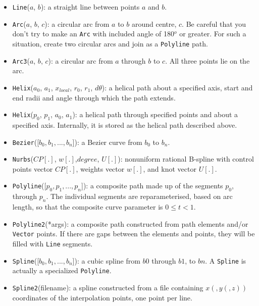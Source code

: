 \begin{itemize}
\item \texttt{Line}($a$, $b$): a straight line between points $a$ and $b$.
\item \texttt{Arc}($a$, $b$, $c$): a circular arc from $a$ to $b$ around centre,
  $c$.
  Be careful that you don't try to make an \texttt{Arc} with included angle of 180$^o$ or greater.
  For such a situation, create two circular arcs and join as a \texttt{Polyline} path.
\item \texttt{Arc3}($a$, $b$, $c$): a circular arc from $a$ through $b$ to $c$.
  All three points lie on the arc.
\item \texttt{Helix}($a_0$, $a_1$, $x_{local}$, $r_0$, $r_1$, $d\theta$): a helical path
  about a specified axis, start and end radii and angle through which the path extends.
\item \texttt{Helix}($p_0$, $p_1$, $a_0$, $a_1$): a helical path through specified points
  and about a specified axis.
  Internally, it is stored as the helical path described above.
\item \texttt{Bezier}([$b_0, b_1, ..., b_n$]): a Bezier curve from $b_0$ to
  $b_n$.
\item \texttt{Nurbs}($CP[.]$, $w[.]$,$degree$, $U[.]$): nonuniform rational B-spline with
  control points vector $CP[.]$, weights vector $w[.]$, and knot vector $U[.]$.
\item \texttt{Polyline}([$p_0, p_1, ..., p_n$]): a composite path made up of 
  the segments $p_0$, through $p_n$.
  The individual segments are reparameterised, based on arc length, so that
  the composite curve parameter is $0 \le t < 1$.
\item \texttt{Polyline2}(*args): a composite path constructed from path elements and/or \texttt{Vector} points.
  If there are gaps between the elements and points, 
  they will be filled with \texttt{Line} segments.
\item \texttt{Spline}([$b_0, b_1, ..., b_n$]): a cubic spline from $b0$ through
  $b1$, to $bn$.
  A \texttt{Spline} is actually a specialized \texttt{Polyline}.
\item \texttt{Spline2}(filename): a spline constructed from a file containing $x(,y(,z))$ coordinates
  of the interpolation points, one point per line.

\end{itemize}
